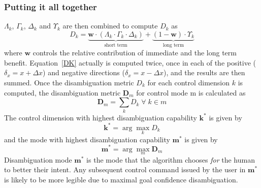 \documentclass[conference]{IEEEtran}
\newcommand{\argmax}{\arg\!\max}
\begin{document}
\subsubsection*{Putting it all together}
$\Lambda_{k}$, $\Gamma_{k}$, $\Delta_{k}$ and $\Upsilon_{k}$ are then combined to compute $D_{k}$ as 
\begin{equation}\label{DK}
D_{k} = \underbrace{\boldsymbol{w}\cdot(\Lambda_{k}\cdot \Gamma_{k}\cdot \Delta_{k})}_{\text{short term}} + \underbrace{(1 - \boldsymbol{w})\cdot \Upsilon_{k}}_{\text{long term}}
\end{equation}
where $\boldsymbol{w}$ controls the relative contribution of immediate and the long term benefit. Equation~\ref{DK} actually is computed twice, once in each of the positive ($\delta_x = x + \Delta x$) and negative directions ($\delta_x = x - \Delta x$), and the results are then summed. 
Once the disambiguation metric $D_k$ for each control dimension $k$ is computed, the disambiguation metric $\boldsymbol{D}_m$ for control mode m is calculated as 
\begin{equation*}
\boldsymbol{D}_m = \sum_{k} D_{k} \; \forall \; k \in m
\end{equation*}
The control dimension with highest disambiguation capability $\boldsymbol{k}^*$ is given by
\begin{equation*}
\boldsymbol{k}^* = \argmax_k D_{k}
\end{equation*}
 and the mode with highest disambiguation capability $\boldsymbol{m}^{*}$ is given by
\begin{equation*}
\boldsymbol{m}^* = \argmax_m \boldsymbol{D}_m
\end{equation*}
Disambiguation mode $\boldsymbol{m}^{*}$ is the mode that the algorithm chooses \textit{for} the human to better their intent. Any subsequent control command issued by the user in $\boldsymbol{m}^*$ is likely to be more legible due to maximal goal confidence disambiguation.
\end{document}
